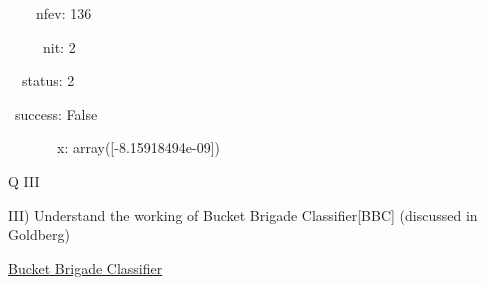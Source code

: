 \documentclass[12pt]{article}
\renewcommand{\_}{\kern-1.5pt\textunderscore\kern-1.5pt}
\begin{document}
{\fontsize{10pt}{12.0pt}\selectfont \ \ \ \  nfev: 136\par}\par

{\fontsize{10pt}{12.0pt}\selectfont \ \ \ \ \  nit: 2\par}\par

{\fontsize{10pt}{12.0pt}\selectfont \ \  status: 2\par}\par

{\fontsize{10pt}{12.0pt}\selectfont \  success: False\par}\par

{\fontsize{10pt}{12.0pt}\selectfont \ \ \ \ \ \ \  x: array([-8.15918494e-09])\par}\par


\vspace{\baselineskip}

\vspace{\baselineskip}

\vspace{\baselineskip}

\vspace{\baselineskip}

\vspace{\baselineskip}

\vspace{\baselineskip}

\vspace{\baselineskip}

\vspace{\baselineskip}

\vspace{\baselineskip}

\vspace{\baselineskip}

\vspace{\baselineskip}
\begin{Center}
{\fontsize{28pt}{33.6pt}\selectfont Q III\par}
\end{Center}\par

{\fontsize{14pt}{16.8pt}\selectfont III) Understand the working of Bucket Brigade Classifier[BBC] (discussed in Goldberg)\par}\par

{\fontsize{14pt}{16.8pt}\selectfont \uline{Bucket Brigade Classifier}\par}\par
\end{document}
